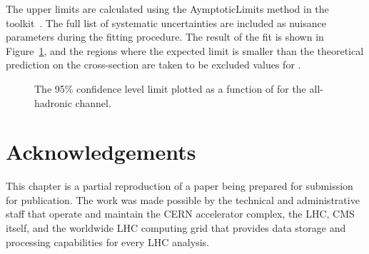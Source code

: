 The upper limits are calculated using the AymptoticLimits method in the \COMBINE toolkit~\cite{CombinePaper}.
The full list of systematic uncertainties are included as nuisance parameters during the fitting procedure.
The result of the fit is shown in Figure~\ref{fig:vbsvvh_limit}, and the regions where the expected limit is smaller than the theoretical prediction on the cross-section are taken to be excluded values for \kVV.

\begin{figure}[htb]
    \centering
    \caption{The 95\% confidence level limit plotted as a function of \kVV for the all-hadronic channel. 
    }
    \label{fig:vbsvvh_limit}
\end{figure}

\section{Acknowledgements}
This chapter is a partial reproduction of a paper being prepared for submission for publication. 
The work was made possible by the technical and administrative staff that operate and maintain the CERN accelerator complex, the LHC, CMS itself, and the worldwide LHC computing grid that provides data storage and processing capabilities for every LHC analysis. 
